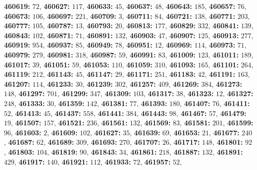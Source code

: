 \textsf{\bfseries 460619:} $72$, \textsf{\bfseries 460627:} $117$, \textsf{\bfseries 460633:} $45$, \textsf{\bfseries 460637:} $48$, \textsf{\bfseries 460643:} $185$, \textsf{\bfseries 460657:} $76$, \textsf{\bfseries 460673:} $106$, \textsf{\bfseries 460697:} $221$, \textsf{\bfseries 460709:} $3$, \textsf{\bfseries 460711:} $84$, \textsf{\bfseries 460721:} $138$, \textsf{\bfseries 460771:} $203$, \textsf{\bfseries 460777:} $105$, \textsf{\bfseries 460787:} $13$, \textsf{\bfseries 460793:} $20$, \textsf{\bfseries 460813:} $177$, \textsf{\bfseries 460829:} $332$, \textsf{\bfseries 460841:} $139$, \textsf{\bfseries 460843:} $102$, \textsf{\bfseries 460871:} $71$, \textsf{\bfseries 460891:} $132$, \textsf{\bfseries 460903:} $47$, \textsf{\bfseries 460907:} $125$, \textsf{\bfseries 460913:} $277$, \textsf{\bfseries 460919:} $954$, \textsf{\bfseries 460937:} $85$, \textsf{\bfseries 460949:} $78$, \textsf{\bfseries 460951:} $12$, \textsf{\bfseries 460969:} $114$, \textsf{\bfseries 460973:} $71$, \textsf{\bfseries 460979:} $279$, \textsf{\bfseries 460981:} $318$, \textsf{\bfseries 460987:} $59$, \textsf{\bfseries 460991:} $83$, \textsf{\bfseries 461009:} $123$, \textsf{\bfseries 461011:} $189$, \textsf{\bfseries 461017:} $39$, \textsf{\bfseries 461051:} $59$, \textsf{\bfseries 461053:} $110$, \textsf{\bfseries 461059:} $310$, \textsf{\bfseries 461093:} $165$, \textsf{\bfseries 461101:} $264$, \textsf{\bfseries 461119:} $212$, \textsf{\bfseries 461143:} $45$, \textsf{\bfseries 461147:} $29$, \textsf{\bfseries 461171:} $251$, \textsf{\bfseries 461183:} $42$, \textsf{\bfseries 461191:} $163$, \textsf{\bfseries 461207:} $114$, \textsf{\bfseries 461233:} $30$, \textsf{\bfseries 461239:} $302$, \textsf{\bfseries 461257:} $409$, \textsf{\bfseries 461269:} $384$, \textsf{\bfseries 461273:} $148$, \textsf{\bfseries 461297:} $701$, \textsf{\bfseries 461299:} $347$, \textsf{\bfseries 461309:} $103$, \textsf{\bfseries 461317:} $38$, \textsf{\bfseries 461323:} $12$, \textsf{\bfseries 461327:} $248$, \textsf{\bfseries 461333:} $30$, \textsf{\bfseries 461359:} $142$, \textsf{\bfseries 461381:} $77$, \textsf{\bfseries 461393:} $180$, \textsf{\bfseries 461407:} $76$, \textsf{\bfseries 461411:} $52$, \textsf{\bfseries 461413:} $45$, \textsf{\bfseries 461437:} $558$, \textsf{\bfseries 461441:} $384$, \textsf{\bfseries 461443:} $98$, \textsf{\bfseries 461467:} $57$, \textsf{\bfseries 461479:} $19$, \textsf{\bfseries 461507:} $157$, \textsf{\bfseries 461521:} $236$, \textsf{\bfseries 461561:} $132$, \textsf{\bfseries 461569:} $83$, \textsf{\bfseries 461581:} $201$, \textsf{\bfseries 461599:} $96$, \textsf{\bfseries 461603:} $2$, \textsf{\bfseries 461609:} $102$, \textsf{\bfseries 461627:} $35$, \textsf{\bfseries 461639:} $69$, \textsf{\bfseries 461653:} $21$, \textsf{\bfseries 461677:} $240$, \textsf{\bfseries 461687:} $62$, \textsf{\bfseries 461689:} $309$, \textsf{\bfseries 461693:} $270$, \textsf{\bfseries 461707:} $26$, \textsf{\bfseries 461717:} $148$, \textsf{\bfseries 461801:} $92$, \textsf{\bfseries 461803:} $104$, \textsf{\bfseries 461819:} $90$, \textsf{\bfseries 461843:} $34$, \textsf{\bfseries 461861:} $218$, \textsf{\bfseries 461887:} $132$, \textsf{\bfseries 461891:} $429$, \textsf{\bfseries 461917:} $140$, \textsf{\bfseries 461921:} $112$, \textsf{\bfseries 461933:} $72$, \textsf{\bfseries 461957:} $52$, 

